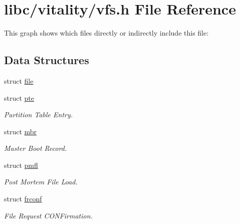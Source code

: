 \hypertarget{a00185}{}\section{libc/vitality/vfs.h File Reference}
\label{a00185}
This graph shows which files directly or indirectly include this file\+:
\subsection*{Data Structures}
\begin{DoxyCompactItemize}
\item 
struct \hyperlink{a00298}{file}
\item 
struct \hyperlink{a00302}{pte}
\begin{DoxyCompactList}\small\item\em Partition Table Entry. \end{DoxyCompactList}\item 
struct \hyperlink{a00306}{mbr}
\begin{DoxyCompactList}\small\item\em Master Boot Record. \end{DoxyCompactList}\item 
struct \hyperlink{a00310}{pmfl}
\begin{DoxyCompactList}\small\item\em Post Mortem File Load. \end{DoxyCompactList}\item 
struct \hyperlink{a00314}{frconf}
\begin{DoxyCompactList}\small\item\em File Request C\+O\+N\+Firmation. \end{DoxyCompactList}\end{DoxyCompactItemize}
